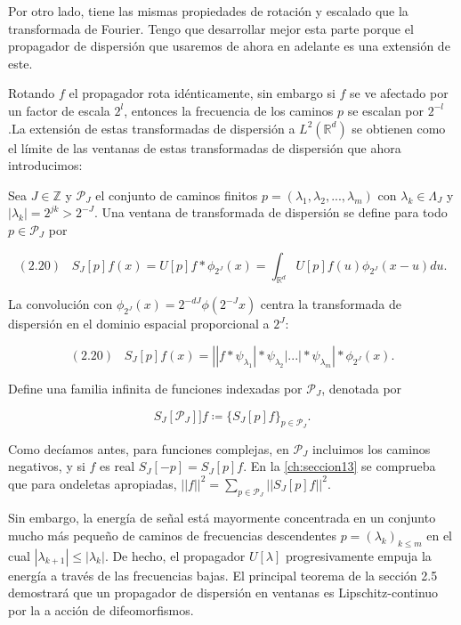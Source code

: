 \medskip

\noindent Por otro lado, tiene las mismas propiedades de rotación y escalado que la transformada de Fourier. Tengo que desarrollar mejor esta parte porque el propagador de dispersión que usaremos de ahora en adelante es una extensión de este.


\medskip

\noindent Rotando $f$ el propagador rota idénticamente, sin embargo si $f$ se ve afectado por un factor de escala $2^l$, entonces la frecuencia de los caminos $p$ se escalan por $2^{-l}$.La extensión de estas transformadas de dispersión a $L^2(\mathbb{R}^d)$ se obtienen como el límite de las ventanas de estas transformadas de dispersión que ahora introducimos:

\begin{definicion}
Sea $J \in \mathbb{Z}$ y $\mathcal{P}_J$ el conjunto de caminos finitos $p=(\lambda_1,\lambda_2,...,\lambda_m)$ con $\lambda_k \in \Lambda_J$ y $|\lambda_k|=2^{jk}>2^{-J}$. Una ventana de transformada de dispersión se define para todo $p \in \mathcal{P}_J$ por

$$(2.20) \;\;\; S_J[p]f(x)=U[p]f \ast \phi_{2^J}(x)=\int_{\mathbb{R}^d}U[p]f(u)\phi_{2^J}(x-u)du.$$
\end{definicion}

\medskip

\noindent La convolución con $\phi_{2^J}(x)=2^{-dJ}\phi(2^{-J}x)$ centra la transformada de dispersión en el dominio espacial proporcional a $2^J$: 

$$(2.20) \;\;\; S_J[p]f(x)=\left| |f \ast \psi_{\lambda_1} | \ast \psi_{\lambda_2} | ... | \ast \psi_{\lambda_m} \right| \ast \phi_{2^J}(x).$$

\noindent Define una familia infinita de funciones indexadas por $\mathcal{P}_J$, denotada por

$$S_J[\mathcal{P}_J]]f \coloneqq \lbrace S_J[p]f \rbrace_{p\in\mathcal{P}_J}.$$

\noindent Como decíamos antes, para funciones complejas, en $\mathcal{P}_J$ incluimos los caminos negativos, y si $f$ es real $S_J[-p]=S_J[p]f$.
\noindent En la \autoref{ch:seccion13} se comprueba que para ondeletas apropiadas, $||f||^2=\sum_{p\in\mathcal{P}_J}\left|\left|S_J[p]f\right|\right|^2$. 

\medskip

\noindent Sin embargo, la energía de señal está mayormente concentrada en un conjunto mucho más pequeño de caminos de frecuencias descendentes $p=(\lambda_k)_{k\leq m}$ en el cual $|\lambda_{k+1}| \leq |\lambda_k|$. De hecho, el propagador $U[\lambda]$ progresivamente empuja la energía a través de las frecuencias bajas. El principal teorema de la sección 2.5 demostrará que un propagador de dispersión en ventanas es Lipschitz-continuo por la a acción de difeomorfismos. 

